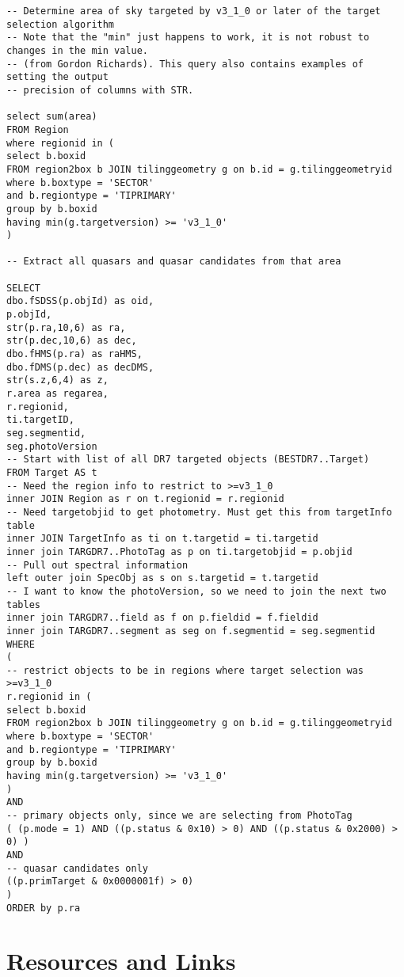 \documentclass[11pt,a4paper]{article}
\begin{document}
\begin{lstlisting}
-- Determine area of sky targeted by v3_1_0 or later of the target selection algorithm 
-- Note that the "min" just happens to work, it is not robust to changes in the min value.
-- (from Gordon Richards). This query also contains examples of setting the output 
-- precision of columns with STR. 

select sum(area) 
FROM Region 
where regionid in (
select b.boxid
FROM region2box b JOIN tilinggeometry g on b.id = g.tilinggeometryid
where b.boxtype = 'SECTOR'
and b.regiontype = 'TIPRIMARY'
group by b.boxid
having min(g.targetversion) >= 'v3_1_0' 
) 

-- Extract all quasars and quasar candidates from that area 

SELECT
dbo.fSDSS(p.objId) as oid,
p.objId,
str(p.ra,10,6) as ra,
str(p.dec,10,6) as dec,
dbo.fHMS(p.ra) as raHMS,
dbo.fDMS(p.dec) as decDMS,
str(s.z,6,4) as z,
r.area as regarea,
r.regionid,
ti.targetID,
seg.segmentid,
seg.photoVersion
-- Start with list of all DR7 targeted objects (BESTDR7..Target) 
FROM Target AS t
-- Need the region info to restrict to >=v3_1_0
inner JOIN Region as r on t.regionid = r.regionid
-- Need targetobjid to get photometry. Must get this from targetInfo table
inner JOIN TargetInfo as ti on t.targetid = ti.targetid
inner join TARGDR7..PhotoTag as p on ti.targetobjid = p.objid
-- Pull out spectral information
left outer join SpecObj as s on s.targetid = t.targetid
-- I want to know the photoVersion, so we need to join the next two tables
inner join TARGDR7..field as f on p.fieldid = f.fieldid
inner join TARGDR7..segment as seg on f.segmentid = seg.segmentid 
WHERE 
(
-- restrict objects to be in regions where target selection was >=v3_1_0
r.regionid in (
select b.boxid
FROM region2box b JOIN tilinggeometry g on b.id = g.tilinggeometryid
where b.boxtype = 'SECTOR'
and b.regiontype = 'TIPRIMARY'
group by b.boxid
having min(g.targetversion) >= 'v3_1_0'
)
AND
-- primary objects only, since we are selecting from PhotoTag
( (p.mode = 1) AND ((p.status & 0x10) > 0) AND ((p.status & 0x2000) > 0) )
AND
-- quasar candidates only
((p.primTarget & 0x0000001f) > 0) 
) 
ORDER by p.ra 
\end{lstlisting}


\newpage
\section*{Resources and Links}
\end{document}
